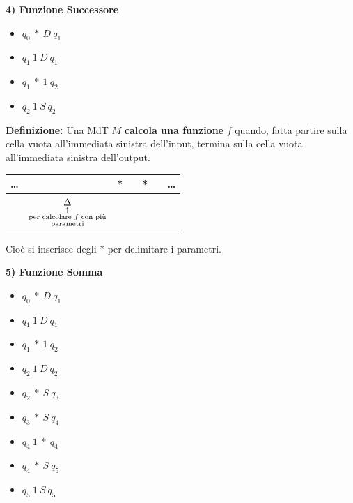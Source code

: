 \vspace{0.6cm}
\textbf{4) Funzione Successore}
\begin{itemize}
    \item[] $q_0 \ * \ D \ q_1$
    \item[] $q_1 \ 1 \ D \ q_1$
    \item[] $q_1 \ * \ 1 \ q_2$
    \item[] $q_2 \ 1 \ S \ q_2$
\end{itemize}

\vspace{0.4cm}
\textbf{Definizione:} Una MdT $M$ \textbf{calcola una funzione} $f$ quando, fatta partire sulla cella vuota all'immediata sinistra dell'input, termina sulla cella vuota all'immediata sinistra dell'output.

\begin{center}
\begin{tabular}{c|c|c|c|c|c|c}
\hline
\dots * & & * & & * & & \dots \\
\hline
\multicolumn{1}{c}{} & \multicolumn{1}{c}{$\underset{\substack{\uparrow \\ \text{\scriptsize per calcolare } f \text{\scriptsize\ con più} \\ \text{\scriptsize parametri}}}{\Delta}$} & \multicolumn{5}{c}{}
\end{tabular}
\end{center}
Cioè si inserisce degli * per delimitare i parametri.

\vspace{0.6cm}
\textbf{5) Funzione Somma}
\begin{itemize}
    \item[] $q_0 \ * \ D \ q_1$ 
    \item[] $q_1 \ 1 \ D \ q_1$ 
    \item[] $q_1 \ * \ 1 \ q_2$ 
    \item[] $q_2 \ 1 \ D \ q_2$
    \item[] $q_2 \ * \ S \ q_3$ 
    \item[] $q_3 \ * \ S \ q_4$
    \item[] $q_4 \ 1 \ * \ q_4$
    \item[] $q_4 \ * \ S \ q_5$ 
    \item[] $q_5 \ 1 \ S \ q_5$ 
\end{itemize}

